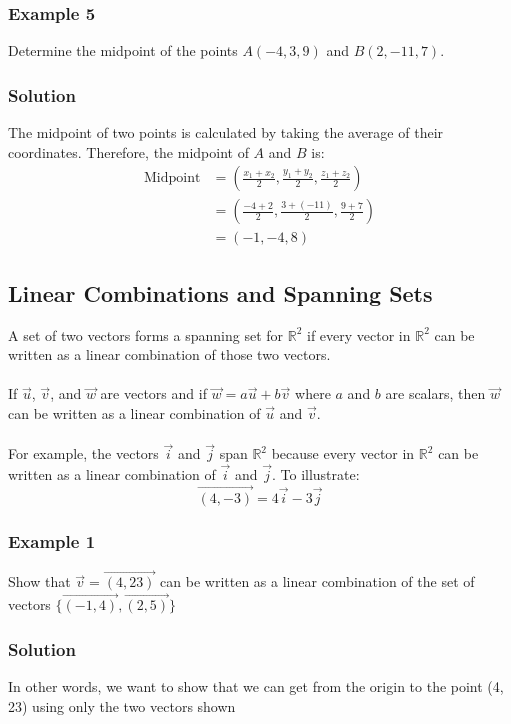 \documentclass{article}
\begin{document}
\subsubsection*{Example 5}
Determine the midpoint of the points $A(-4,3,9)$ and $B(2,-11,7)$.
\subsubsection*{Solution}
The midpoint of two points is calculated by taking the average of their coordinates. Therefore, the midpoint of $A$ and $B$ is:
\begin{align*}
\text{Midpoint}
&= \left(\frac{x_1+x_2}{2}, \frac{y_1+y_2}{2}, \frac{z_1+z_2}{2}\right) \\
&= \left(\frac{-4+2}{2}, \frac{3+(-11)}{2}, \frac{9+7}{2}\right) \\
&= (-1, -4, 8)
\end{align*}
\newpage 
\subsection{Linear Combinations and Spanning Sets}
A set of two vectors forms a spanning set for \(\mathbb{R}^2\) if every vector in \(\mathbb{R}^2\) can be written as a linear combination of those two vectors.\\\\
If \(\vec{u}\), \(\vec{v}\), and \(\vec{w}\) are vectors and if \(\vec{w} = a\vec{u} + b\vec{v}\) where \(a\) and \(b\) are scalars, then \(\vec{w}\) can be written as a linear combination of \(\vec{u}\) and \(\vec{v}\).\\\\
For example, the vectors \(\vec{i}\) and \(\vec{j}\) span \(\mathbb{R}^2\) because every vector in \(\mathbb{R}^2\) can be written as a linear combination of \(\vec{i}\) and \(\vec{j}\). To illustrate:
\[\overrightarrow{(4,-3)} = 4\vec{i} - 3\vec{j}\]
\subsubsection{Example 1}
Show that \(\vec{v}=\overrightarrow{(4,23)}\) can be written as a linear combination of the set of vectors \(\{\overrightarrow{(-1,4)},\overrightarrow{(2,5)}\}\)
\subsubsection*{Solution}
In other words, we want to show that we can get from the origin to the point (4, 23) using only the two vectors shown\\
\end{document}
